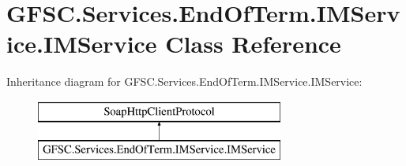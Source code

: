\hypertarget{class_g_f_s_c_1_1_services_1_1_end_of_term_1_1_i_m_service_1_1_i_m_service}{}\section{G\+F\+S\+C.\+Services.\+End\+Of\+Term.\+I\+M\+Service.\+I\+M\+Service Class Reference}
\label{class_g_f_s_c_1_1_services_1_1_end_of_term_1_1_i_m_service_1_1_i_m_service}


 


Inheritance diagram for G\+F\+S\+C.\+Services.\+End\+Of\+Term.\+I\+M\+Service.\+I\+M\+Service\+:\begin{figure}[H]
\begin{center}
\leavevmode
\includegraphics[height=2.000000cm]{class_g_f_s_c_1_1_services_1_1_end_of_term_1_1_i_m_service_1_1_i_m_service}
\end{center}
\end{figure}
